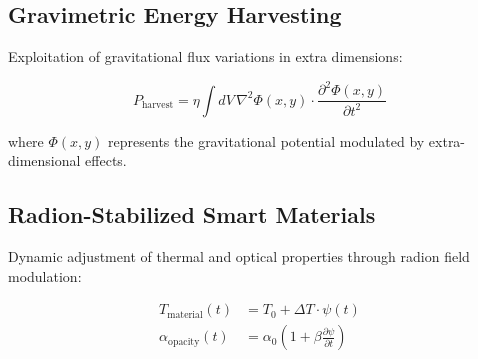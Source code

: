 \documentclass[11pt,letterpaper]{article}
\begin{document}
\subsection{Gravimetric Energy Harvesting}

Exploitation of gravitational flux variations in extra dimensions:

\begin{equation}
P_{\text{harvest}} = \eta \int dV \, \nabla^2 \Phi(x,y) \cdot \frac{\partial^2 \Phi(x,y)}{\partial t^2}
\end{equation}

where $\Phi(x,y)$ represents the gravitational potential modulated by extra-dimensional effects.

\begin{center}
\end{center}

\subsection{Radion-Stabilized Smart Materials}

Dynamic adjustment of thermal and optical properties through radion field modulation:

\begin{align}
T_{\text{material}}(t) &= T_0 + \Delta T \cdot \psi(t) \\
\alpha_{\text{opacity}}(t) &= \alpha_0 \left(1 + \beta \frac{\partial \psi}{\partial t}\right)
\end{align}

\newpage

\end{document}

